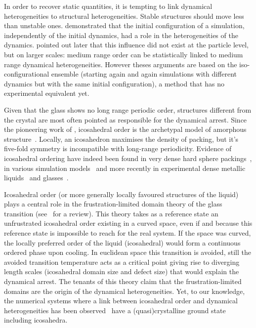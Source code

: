 \documentclass[11pt,a4paper]{article}
\begin{document}
In order to recover static quantities, it is tempting to link dynamical heterogeneities to structural heterogeneities. Stable structures should move less than unstable ones. \citet{Widmer-Cooper2005} demonstrated that the initial configuration of a simulation, independently of the initial dynamics, had a role in the heterogeneities of the dynamics. \citet{Berthier2007} pointed out later that this influence did not exist at the particle level, but on larger scales: medium range order can be statistically linked to medium range dynamical heterogeneities. However theses arguments are based on the iso-configurational ensemble (starting again and again simulations with different dynamics but with the same initial configuration), a method that has no experimental equivalent yet.

Given that the glass shows no long range periodic order, structures different from the crystal are most often pointed as responsible for the dynamical arrest. Since the pioneering work of \citet{Frank1952}, icosahedral order is the archetypal model of amorphous structure~\citep{Spaepen2000}. Locally, an icosahedron maximises the density of packing, but it's five-fold symmetry is incompatible with long-range periodicity. Evidence of icosahedral ordering have indeed been found in very dense hard sphere packings~\citep{Bernal1960, Clarke1993, Malshe2011}, in various simulation models~\citep{steinhardt1983boo, Tomida1995, Doye2003, Coslovich2007, Pedersen2010, Coslovich2011} and more recently in experimental dense metallic liquids~\citep{Reichert2000, Celino2007} and glasses~\citep{Luo2004, Wang2011}.

Icosahedral order (or more generally locally favoured structures of the liquid) plays a central role in the frustration-limited domain theory of the glass transition (see~\citep{tarjus2005fba} for a review). This theory takes as a reference state an unfrustrated icosahedral order existing in a curved space, even if and because this reference state is impossible to reach for the real system. If the space was curved, the locally preferred order of the liquid (icosahedral) would form a continuous ordered phase upon cooling. In euclidean space this transition is avoided, still the avoided transition temperature acts as a critical point giving rise to diverging length scales (icosahedral domain size and defect size) that would explain the dynamical arrest. The tenants of this theory claim that the frustration-limited domains are the origin of the dynamical heterogeneities. Yet, to our knowledge, the numerical systems where a link between icosahedral order and dynamical heterogeneities has been observed~\citep{Dzugutov2002, Doye2003, Coslovich2007, Pedersen2010, Coslovich2011} have a (quasi)crystalline ground state including icosahedra.
\end{document}
